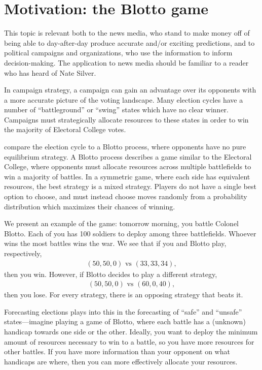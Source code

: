 \documentclass[thesis.tex]{subfiles}
\begin{document}
\section{Motivation: the Blotto game}

This topic is relevant both to the news media, who stand to make money off of being able to day-after-day produce accurate and/or exciting predictions, and to political campaigns and organizations, who use the information to inform decision-making. The application to news media should be familiar to a reader who has heard of Nate Silver.

In campaign strategy, a campaign can gain an advantage over its opponents with a more accurate picture of the voting landscape. Many election cycles have a number of ``battleground'' or ``swing'' states which have no clear winner. Campaigns must strategically allocate resources to these states in order to win the majority of Electoral College votes.

\cite{Merolla:2005aa} compare the election cycle to a Blotto process, where opponents have no pure equilibrium strategy. A Blotto process describes a game similar to the Electoral College, where opponents must allocate resources across multiple battlefields to win a majority of battles. In a symmetric game, where each side has equivalent resources, the best strategy is a mixed strategy. Players do not have a single best option to choose, and must instead choose moves randomly from a probability distribution which maximizes their chances of winning.

We present an example of the game: tomorrow morning, you battle Colonel Blotto. Each of you has 100 soldiers to deploy among three battlefields. Whoever wins the most battles wins the war. We see that if you and Blotto play, respectively, \begin{equation*}\begin{aligned}
	(50, 50, 0) \text{ vs } (33, 33, 34),
\end{aligned}\end{equation*} then you win. However, if Blotto decides to play a different strategy, \begin{equation*}\begin{aligned}
	(50, 50, 0) \text{ vs } (60, 0, 40),
\end{aligned}\end{equation*} then you lose. For every strategy, there is an opposing strategy that beats it.

Forecasting elections plays into this in the forecasting of ``safe'' and ``unsafe'' states---imagine playing a game of Blotto, where each battle has a (unknown) handicap towards one side or the other. Ideally, you want to deploy the minimum amount of resources necessary to win to a battle, so you have more resources for other battles. If you have more information than your opponent on what handicaps are where, then you can more effectively allocate your resources.
\end{document}
